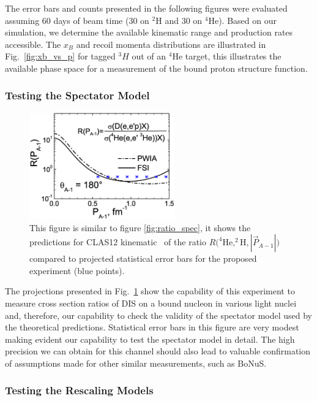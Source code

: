 The error bars and counts presented in the following figures were evaluated assuming 60 days of beam time (30 on $^2$H and 30 on $^4$He). Based on our simulation, we determine the available kinematic range and production rates accessible. The $x_B$ and recoil momenta distributions are illustrated in Fig.~\ref{fig:xb_vs_p} for tagged $^3H$ out of an $^4$He target, this illustrates the available phase space for a measurement of the bound proton structure function. 

\subsubsection{Testing the Spectator Model}

\begin{figure}[tbp]
  \begin{center}
    \includegraphics[angle=0, width=0.56\textwidth]{./fig-chap3/Ratio_He4}
    \caption{This figure is similar to figure \ref{fig:ratio_spec}, it shows the predictions for CLAS12 kinematic~\cite{CiofidegliAtti1999,CiofidegliAtti2012} of the ratio $R(^4$He$,^2$H$,|\vec P_{A-1}|)$ compared to projected statistical error bars for the proposed experiment (blue points).}
    \label{fig:ratio_spec_proj}
  \end{center}
\end{figure}

The projections presented in Fig.~\ref{fig:ratio_spec_proj} show the capability of this experiment to measure cross section ratios of DIS on a bound nucleon in various light nuclei and, therefore, our capability to check the validity of the spectator model used by the theoretical predictions. Statistical error bars in this figure are very modest making evident our capability to test the spectator model in detail. The high precision we can obtain for this channel should also lead to valuable confirmation of assumptions made for other similar measurements, such as BoNuS.

\subsubsection{Testing the Rescaling Models}

